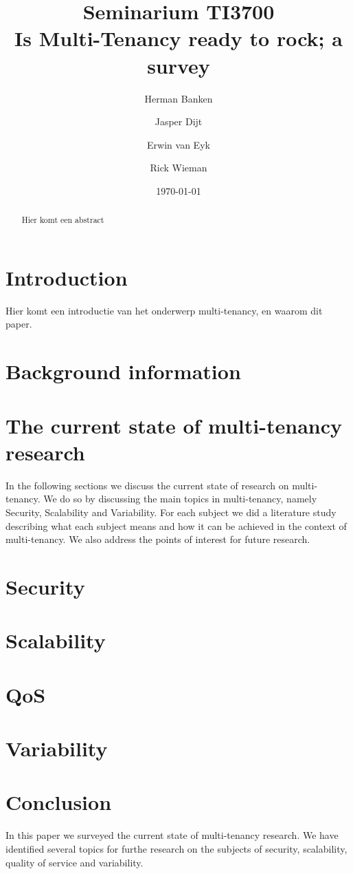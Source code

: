 \documentclass{article}
\title{Seminarium TI3700\\ Is Multi-Tenancy ready to rock; a survey}
\author{Herman Banken\and
    Jasper Dijt\and
    Erwin van Eyk\and
    Rick Wieman}
\date{\today}
\begin{document}
\maketitle
\thispagestyle{empty}

\begin{abstract}
Hier komt een abstract
\end{abstract}


\section{Introduction}
Hier komt een introductie van het onderwerp multi-tenancy, en waarom dit paper.

\section{Background information}


\section{The current state of multi-tenancy research}
In the following sections we discuss the current state of research on multi-tenancy. We do so by discussing the main topics in multi-tenancy, namely Security, Scalability and Variability. For each subject we did a literature study describing what each subject means and how it can be achieved in the context of multi-tenancy. We also address the points of interest for future research.

\section{Security}


\section{Scalability}


\section{\acf{QoS}}


\section{Variability}



\section{Conclusion}
In this paper we surveyed the current state of multi-tenancy research.
We have identified several topics for furthe research on the subjects of security, scalability, quality of service and variability.




\end{document}

